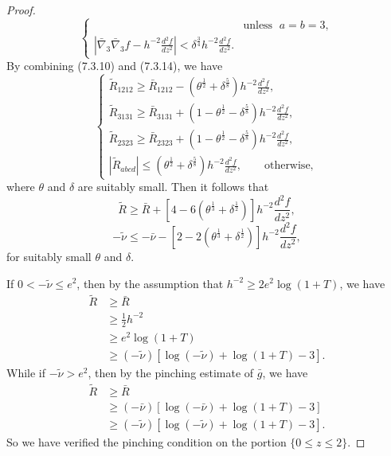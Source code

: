 \begin{proof}
\begin{equation}
\begin{cases}
& \mbox{unless }\;  a=b=3, \\[1mm]
|\bar{\nabla}_3\bar{\nabla}_3f - h^{-2}\frac{d^2f}{dz^2}| <
\delta^{\frac{3}{4}}h^{-2}\frac{d^2f}{dz^2}.
\end{cases} %
\end{equation} By combining (7.3.10) and (7.3.14), we have \begin{equation} \left\{
\begin{array}{lll}
\tilde{R}_{1212} \geq \bar{R}_{1212} - (\theta^{\frac{1}{2}}
+ \delta^{\frac{5}{8}})h^{-2}\frac{d^2f}{dz^2}, \\[1mm]
\tilde{R}_{3131} \geq \bar{R}_{3131} + (1 - \theta^{\frac{1}{2}}
- \delta^{\frac{5}{8}})h^{-2}\frac{d^2f}{dz^2},  \\[1mm]
\tilde{R}_{2323} \geq \bar{R}_{2323} + (1 - \theta^{\frac{1}{2}}
- \delta^{\frac{5}{8}})h^{-2}\frac{d^2f}{dz^2}, \\[1mm]
|\tilde{R}_{abcd}| \leq (\theta^{\frac{1}{2}} +
\delta^{\frac{5}{8}})h^{-2}\frac{d^2f}{dz^2}, \qquad
\mbox{otherwise},
\end{array}
\right. %
\end{equation} where $\theta$ and $\delta$ are suitably small. Then it
follows that
$$
\tilde{R} \geq \bar{R} + [4-6(\theta^{\frac{1}{3}} +
\delta^{\frac{1}{2}})]h^{-2}\frac{d^2f}{dz^2},
$$
$$
-\tilde{\nu} \leq -\bar{\nu} - [2-2(\theta^{\frac{1}{3}} +
\delta^{\frac{1}{2}})]h^{-2}\frac{d^2f}{dz^2},
$$
for suitably small $\theta$ and $\delta$.

If $0<-\tilde{\nu} \leq e^2$, then by the assumption that $h^{-2}
\geq 2e^2\log(1+T)$, we have
\begin{align*}
\tilde{R} &\geq \bar{R}\\
&  \geq \frac{1}{2}h^{-2} \\
&  \geq e^2\log(1+T)\\[2mm]
&  \geq (-\tilde{\nu})[\log(-\tilde{\nu}) + \log(1+T) -3].
\end{align*}
While if $-\tilde{\nu} > e^2$, then by the pinching estimate of
$\bar{g}$, we have
\begin{align*}
\tilde{R}&  \geq \bar{R}\\
&  \geq (-\bar{\nu})[\log(-\bar{\nu}) + \log(1+T) -3] \\
&  \geq (-\tilde{\nu})[\log(-\tilde{\nu}) + \log(1+T) -3].
\end{align*}
So we have verified the pinching condition on the portion $\{0
\leq z \leq 2\}$.


\end{proof}
